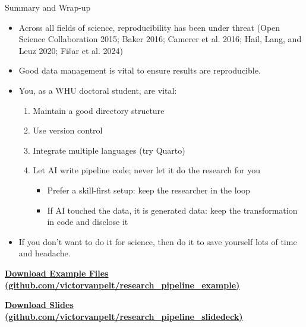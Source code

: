 \documentclass[
  ignorenonframetext,
  aspectratio=169,
]{beamer}
\providecommand{\tightlist}{%
  \setlength{\itemsep}{0pt}\setlength{\parskip}{0pt}}
\begin{document}
\begin{frame}{Summary and Wrap-up}
\label{summary-and-wrap-up}
\begin{itemize}
\tightlist
\item
  Across all fields of science, reproducibility has been under threat
  (Open Science Collaboration 2015; Baker 2016; Camerer et al. 2016;
  Hail, Lang, and Leuz 2020; Fišar et al. 2024)
\item
  Good data management is vital to ensure results are reproducible.
\item
  You, as a WHU doctoral student, are vital:

  \begin{enumerate}
  \tightlist
  \item
    Maintain a good directory structure
  \item
    Use version control
  \item
    Integrate multiple languages (try Quarto)
  \item
    Let AI write pipeline code; never let it do the research for you

    \begin{itemize}
    \tightlist
    \item
      Prefer a skill-first setup: keep the researcher in the loop
    \item
      If AI touched the data, it is generated data: keep the
      transformation in code and disclose it
    \end{itemize}
  \end{enumerate}
\item
  If you don't want to do it for science, then do it to save yourself
  lots of time and headache.
\end{itemize}

\centering

\href{https://github.com/victorvanpelt/research_pipeline_example}{\textbf{Download
Example Files (github.com/victorvanpelt/research\_pipeline\_example)}}

\href{https://github.com/victorvanpelt/research_pipeline_slidedeck}{\textbf{Download
Slides (github.com/victorvanpelt/research\_pipeline\_slidedeck)}}
\end{frame}
\end{document}
